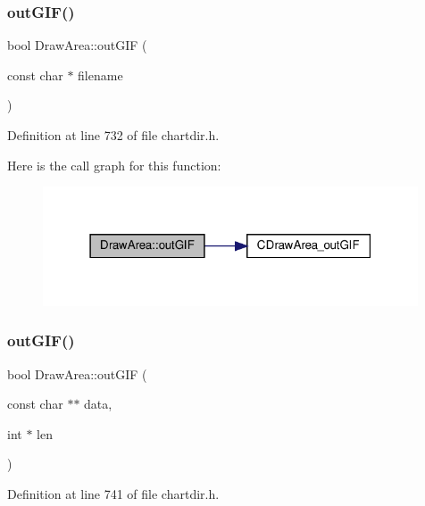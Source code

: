 \subsubsection{\texorpdfstring{out\+G\+I\+F()}{outGIF()}\hspace{0.1cm}{\footnotesize\ttfamily [1/3]}}
{\footnotesize\ttfamily bool Draw\+Area\+::out\+G\+IF (\begin{DoxyParamCaption}\item[{const char $\ast$}]{filename }\end{DoxyParamCaption})\hspace{0.3cm}{\ttfamily [inline]}}



Definition at line 732 of file chartdir.\+h.

Here is the call graph for this function\+:
\nopagebreak
\begin{figure}[H]
\begin{center}
\leavevmode
\includegraphics[width=315pt]{class_draw_area_aa4817265f2bffb24e1544cf45abf6213_cgraph}
\end{center}
\end{figure}
\mbox{\label{class_draw_area_ac6de24287102bd8e83aaf7a8c7e3eb56}} 
\subsubsection{\texorpdfstring{out\+G\+I\+F()}{outGIF()}\hspace{0.1cm}{\footnotesize\ttfamily [2/3]}}
{\footnotesize\ttfamily bool Draw\+Area\+::out\+G\+IF (\begin{DoxyParamCaption}\item[{const char $\ast$$\ast$}]{data,  }\item[{int $\ast$}]{len }\end{DoxyParamCaption})\hspace{0.3cm}{\ttfamily [inline]}}



Definition at line 741 of file chartdir.\+h.

